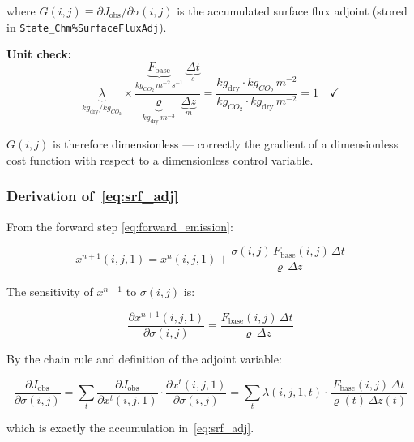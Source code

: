 \documentclass[12pt]{article}
\begin{document}
where $G(i,j) \equiv \partial J_{\mathrm{obs}} / \partial \sigma(i,j)$
is the accumulated surface flux adjoint (stored in
\texttt{State\_Chm\%SurfaceFluxAdj}).

\textbf{Unit check:}
\begin{equation}
  \underbrace{\lambda}_{\si{kg_{\mathrm{dry}}/kg_{CO_2}}}
  \times
  \frac{\underbrace{F_{\mathrm{base}}}_{\si{kg_{CO_2}\,m^{-2}\,s^{-1}}}
        \;\underbrace{\Delta t}_{\si{s}}}
  {\underbrace{\varrho}_{\si{kg_{\mathrm{dry}}\,m^{-3}}}
   \;\underbrace{\Delta z}_{\si{m}}}
  =
  \frac{\si{kg_{\mathrm{dry}}} \cdot \si{kg_{CO_2}\,m^{-2}}}
       {\si{kg_{CO_2}} \cdot \si{kg_{\mathrm{dry}}\,m^{-2}}}
  = 1 \quad \checkmark
\end{equation}

$G(i,j)$ is therefore dimensionless — correctly the gradient of a dimensionless cost
function with respect to a dimensionless control variable.

\subsubsection{Derivation of~\eqref{eq:srf_adj}}

From the forward step \eqref{eq:forward_emission}:

\begin{equation}
  x^{n+1}(i,j,1) = x^n(i,j,1) + \frac{\sigma(i,j)\,F_{\mathrm{base}}(i,j)\,\Delta t}
                                       {\varrho\,\Delta z}
\end{equation}

The sensitivity of $x^{n+1}$ to $\sigma(i,j)$ is:

\begin{equation}
  \frac{\partial x^{n+1}(i,j,1)}{\partial \sigma(i,j)}
  = \frac{F_{\mathrm{base}}(i,j)\,\Delta t}{\varrho\,\Delta z}
\end{equation}

By the chain rule and definition of the adjoint variable:

\begin{equation}
  \frac{\partial J_{\mathrm{obs}}}{\partial \sigma(i,j)}
  = \sum_t \frac{\partial J_{\mathrm{obs}}}{\partial x^t(i,j,1)}
    \cdot \frac{\partial x^t(i,j,1)}{\partial \sigma(i,j)}
  = \sum_t \lambda(i,j,1,t) \cdot \frac{F_{\mathrm{base}}(i,j)\,\Delta t}
                                        {\varrho(t)\,\Delta z(t)}
\end{equation}

which is exactly the accumulation in~\eqref{eq:srf_adj}.
\end{document}
